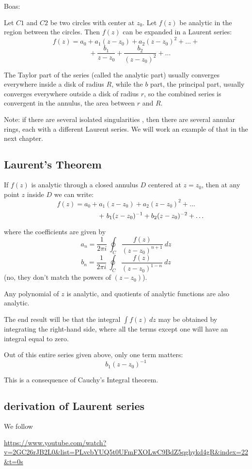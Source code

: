 \documentclass[11pt, oneside]{article}
\begin{document}
Boas:

Let $C1$ and $C2$ be two circles with center at $z_0$.  Let $f(z)$ be analytic in the region between the circles.  Then $f(z)$ can be expanded in a Laurent series:
\[ f(z) = a_0 + a_1 (z - z_0) + a_2 (z - z_0)^2 + \dots + \]
\[ \ \ \ \ \ + \frac{b_1}{z - z_0} + \frac{b_2}{(z - z_0)^2} + \dots \]

The Taylor part of the series (called the analytic part) usually converges everywhere inside a disk of radius $R$, while the $b$ part, the principal part, usually converges everywhere outside a disk of radius $r$, so the combined series is convergent in the annulus, the area between $r$ and $R$.

Note:  if there are several isolated singularities , then there are several annular rings, each with a different Laurent series.  We will work an example of that in the next chapter.

\subsection*{Laurent's Theorem}
If $f(z)$ is analytic through a closed annulus $D$ centered at $z = z_0$, then at any point $z$ inside $D$ we can write:
\[ f(z) = a_0 + a_1(z-z_0) + a_2(z-z_0)^2 + \dots \]
\[ \hspace{27mm} + \ b_1(z-z_0)^{-1} + b_2(z-z_0)^{-2} + \dots \]

where the coefficients are given by
\[ a_n = \frac{1}{2 \pi i} \ \oint_C \frac{f(z)}{(z - z_0)^{n+1}} \ dz \]
\[ b_n = \frac{1}{2 \pi i} \ \oint_C \frac{f(z)}{(z - z_0)^{1-n}} \ dz \]
(no, they don't match the powers of $(z - z_0)$).

Any polynomial of $z$ is analytic, and quotients of analytic functions are also analytic.  

The end result will be that the integral $\int f(z) \ dz$ may be obtained by integrating the right-hand side, where all the terms except one will have an integral equal to zero.

Out of this entire series given above, only one term matters:
\[ b_1(z-z_0)^{-1}  \]

This is a consequence of Cauchy's Integral theorem.

\subsection*{derivation of Laurent series}
We follow

\url{https://www.youtube.com/watch?v=2GC26rJB2L0&list=PLvcbYUQ5t0UFmFXOLwC9BdZ5qghykd4gR&index=22&t=0s}
\end{document}
